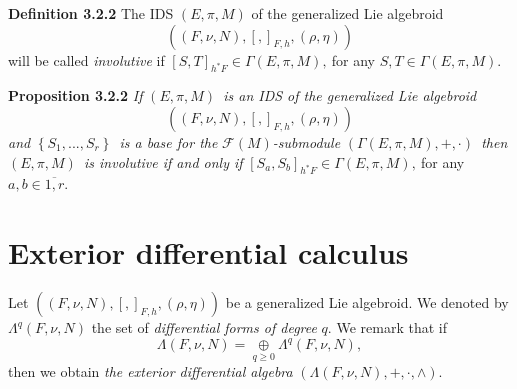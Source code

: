 \documentclass[11pt]{article}
\begin{document}
\textbf{Definition 3.2.2 }The IDS $\left( E,\pi ,M\right) $ of the
generalized Lie algebroid
\begin{equation*}
\left( \left( F,\nu ,N\right) ,\left[ ,\right] _{F,h},\left( \rho ,\eta
\right) \right)
\end{equation*}%
will be called \emph{involutive} if $\left[ S,T\right] _{h^{\ast }F}\in
\Gamma \left( E,\pi ,M\right) ,~$for any $S,T\in \Gamma \left( E,\pi
,M\right) .$

\textbf{Proposition 3.2.2 }\emph{If }$\left( E,\pi ,M\right) $\emph{\ is an
IDS of the generalized Lie algebroid }%
\begin{equation*}
\left( \left( F,\nu ,N\right) ,\left[ ,\right] _{F,h},\left( \rho ,\eta
\right) \right)
\end{equation*}%
\emph{and }$\left\{ S_{1},...,S_{r}\right\} $\emph{\ is a base for the }$%
\mathcal{F}\left( M\right) $\emph{-submodule }$\left( \Gamma \left( E,\pi
,M\right) ,+,\cdot \right) $\emph{\ then }$\left( E,\pi ,M\right) $\emph{\
is involutive if and only if }$\left[ S_{a},S_{b}\right] _{h^{\ast }F}\in
\Gamma \left( E,\pi ,M\right) ,~$for any $a,b\in \overline{1,r}.$

\section{Exterior differential calculus}

Let $\left( \left( F,\nu ,N\right) ,\left[ ,\right] _{F,h},\left( \rho ,\eta
\right) \right) $ be a generalized Lie algebroid. We denoted by $\Lambda
^{q}\left( F,\nu ,N\right) $ the set of \emph{differential forms of degree }$%
q.$ We remark that if
\begin{equation*}
\Lambda \left( F,\nu ,N\right) =\underset{q\geq 0}{\oplus }\Lambda
^{q}\left( F,\nu ,N\right) ,
\end{equation*}%
then we obtain \emph{the exterior differential algebra} $\left( \Lambda
\left( F,\nu ,N\right) ,+,\cdot ,\wedge \right) .$
\end{document}
